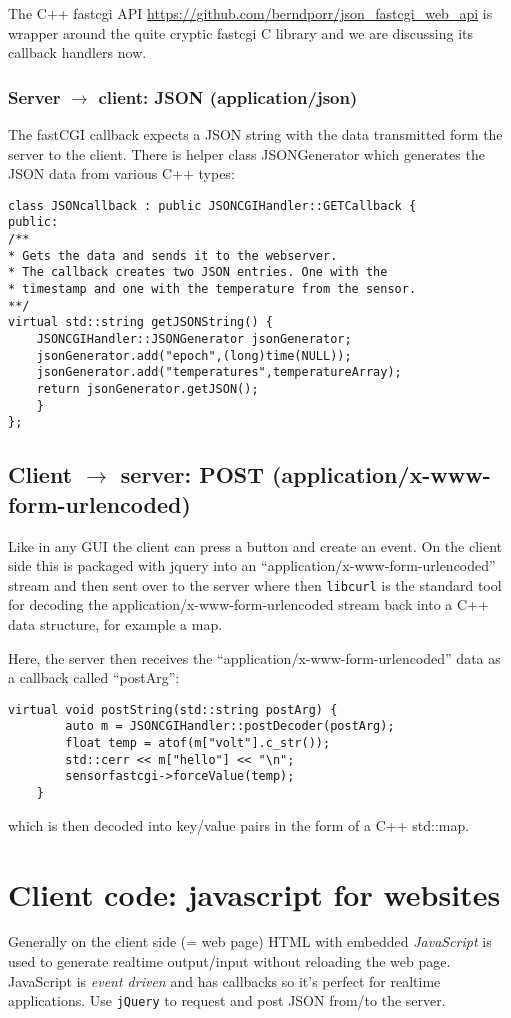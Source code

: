 \documentclass[12pt]{report}
\begin{document}
The C++ fastcgi API \url{https://github.com/berndporr/json_fastcgi_web_api} 
is wrapper around the quite cryptic fastcgi C library and we are discussing
its callback handlers now.

\subsubsection{Server $\to$ client: JSON (application/json)}
The fastCGI callback expects a JSON string with the data
transmitted form the server to the client. There is helper
class JSONGenerator which generates the JSON data from various
C++ types:
\begin{verbatim}
class JSONcallback : public JSONCGIHandler::GETCallback {
public:
/**
* Gets the data and sends it to the webserver.
* The callback creates two JSON entries. One with the
* timestamp and one with the temperature from the sensor.
**/
virtual std::string getJSONString() {
    JSONCGIHandler::JSONGenerator jsonGenerator;
    jsonGenerator.add("epoch",(long)time(NULL));
    jsonGenerator.add("temperatures",temperatureArray);
    return jsonGenerator.getJSON();
    }
};
\end{verbatim} 

\subsection{Client $\to$ server: POST (application/x-www-form-urlencoded)}
Like in any GUI the client can press a button and create an event.  On
the client side this is packaged with jquery into an
``application/x-www-form-urlencoded'' stream and then sent over to the
server where then \texttt{libcurl} is the standard tool for decoding
the application/x-www-form-urlencoded stream back into a C++ data
structure, for example a map.

Here, the server then receives the ``application/x-www-form-urlencoded'' data as a callback
called ``postArg'':
\begin{verbatim}
virtual void postString(std::string postArg) {
		auto m = JSONCGIHandler::postDecoder(postArg);
		float temp = atof(m["volt"].c_str());
		std::cerr << m["hello"] << "\n";
		sensorfastcgi->forceValue(temp);
	}
\end{verbatim}
which is then decoded into key/value pairs in the form of a C++ std::map.

\section{Client code: javascript for websites}
Generally on the client side (= web page) HTML with embedded
\textsl{JavaScript} is used to generate realtime output/input without
reloading the web page. JavaScript is \textsl{event driven} and has
callbacks so it's perfect for realtime applications. Use
\texttt{jQuery} to request and post JSON from/to the server.
\end{document}
